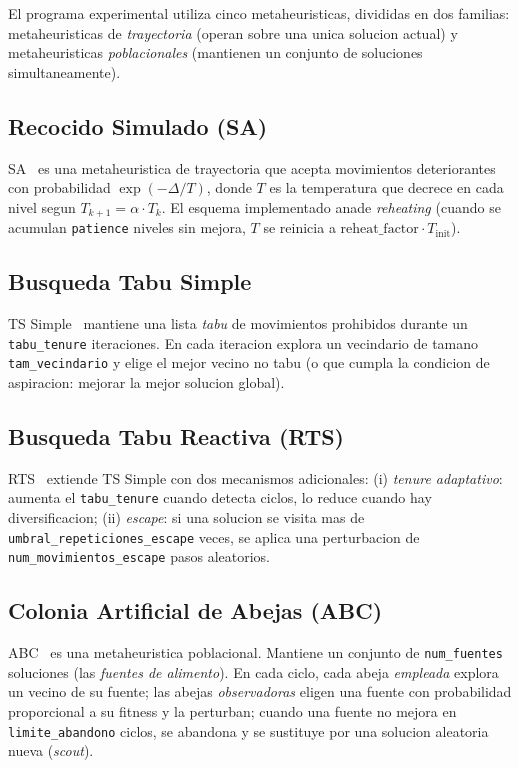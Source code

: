 El programa experimental utiliza cinco metaheuristicas, divididas en dos
familias: metaheuristicas de \emph{trayectoria} (operan sobre una unica
solucion actual) y metaheuristicas \emph{poblacionales} (mantienen un
conjunto de soluciones simultaneamente).

\subsection{Recocido Simulado (SA)}

SA~\cite{kirkpatrick1983} es una metaheuristica de trayectoria que acepta
movimientos deteriorantes con probabilidad $\exp(-\Delta/T)$, donde $T$ es la
temperatura que decrece en cada nivel segun
$T_{k+1} = \alpha \cdot T_k$. El esquema implementado anade
\emph{reheating} (cuando se acumulan \texttt{patience} niveles sin
mejora, $T$ se reinicia a $\text{reheat\_factor} \cdot T_{\text{init}}$).

\subsection{Busqueda Tabu Simple}

TS Simple~\cite{glover1986, glover1997} mantiene una lista \emph{tabu} de movimientos prohibidos
durante un \texttt{tabu\_tenure} iteraciones. En cada iteracion explora
un vecindario de tamano \texttt{tam\_vecindario} y elige el mejor vecino
no tabu (o que cumpla la condicion de aspiracion: mejorar la mejor
solucion global).

\subsection{Busqueda Tabu Reactiva (RTS)}

RTS~\cite{battiti1994} extiende TS Simple con dos mecanismos adicionales:
(i) \emph{tenure adaptativo}: aumenta el \texttt{tabu\_tenure} cuando
detecta ciclos, lo reduce cuando hay diversificacion;
(ii) \emph{escape}: si una solucion se visita mas de
\texttt{umbral\_repeticiones\_escape} veces, se aplica una perturbacion
de \texttt{num\_movimientos\_escape} pasos aleatorios.

\subsection{Colonia Artificial de Abejas (ABC)}

ABC~\cite{karaboga2005} es una metaheuristica poblacional. Mantiene un conjunto de
\texttt{num\_fuentes} soluciones (las \emph{fuentes de alimento}). En
cada ciclo, cada abeja \emph{empleada} explora un vecino de su fuente;
las abejas \emph{observadoras} eligen una fuente con probabilidad
proporcional a su fitness y la perturban; cuando una fuente no mejora
en \texttt{limite\_abandono} ciclos, se abandona y se sustituye por una
solucion aleatoria nueva (\emph{scout}).

